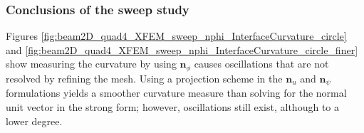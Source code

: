 \subsubsection{Conclusions of the sweep study}
\label{sec:sweep_study_conclusions}

Figures \ref{fig:beam2D_quad4_XFEM_sweep_nphi_InterfaceCurvature_circle} and \ref{fig:beam2D_quad4_XFEM_sweep_nphi_InterfaceCurvature_circle_finer} show measuring the curvature by using $\mathbf{n}_{\phi}$ causes oscillations that are not resolved by refining the mesh. Using a projection scheme in the $\mathbf{n}_{u}$ and $\mathbf{n}_{\psi}$ formulations yields a smoother curvature measure than solving for the normal unit vector in the strong form; however, oscillations still exist, although to a lower degree.